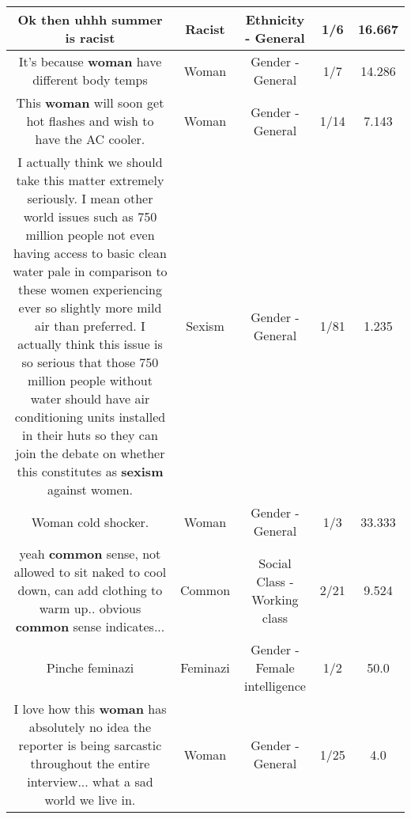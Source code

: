 \documentclass[11pt]{article}
\newlength\mylength
\begin{document}
\begin{center}
\begin{longtable}{|C{.65\mylength}|C{.30\mylength}|C{.12\mylength}|C{.12\mylength}|C{.12\mylength}|}
  \small Ok then uhhh summer is racist\normalsize   & Racist & Ethnicity - General & 1/6 & 16.667 \\  \hline
  \small It's because \textbf{woman} have different body temps\normalsize   & Woman & Gender - General & 1/7 & 14.286 \\  \hline
  \small This \textbf{woman} will soon get hot flashes and wish to have the AC cooler.\normalsize   & Woman & Gender - General & 1/14 & 7.143 \\  \hline
  \small I actually think we should take this matter extremely seriously. I mean other world issues such as 750 million people not even having access to basic clean water pale in comparison to these women experiencing ever so slightly more mild air than preferred. I actually think this issue is so serious that those 750 million people without water should have air conditioning units installed in their huts so they can join the debate on whether this constitutes as \textbf{sexism} against women.\normalsize   & Sexism & Gender - General & 1/81 & 1.235 \\  \hline
  \small Woman cold shocker.\normalsize   & Woman & Gender - General & 1/3 & 33.333 \\  \hline
  \small yeah \textbf{common} sense, not allowed to sit naked to cool down, can add clothing to warm up.. obvious \textbf{common} sense indicates...\normalsize   & Common & Social Class - Working class & 2/21 & 9.524 \\  \hline
  \small Pinche feminazi\normalsize   & Feminazi & Gender - Female intelligence & 1/2 & 50.0 \\  \hline
  \small I love how this \textbf{woman} has absolutely no idea the reporter is being sarcastic throughout the entire interview... what a sad world we live in.\normalsize   & Woman & Gender - General & 1/25 & 4.0 \\  \hline

\end{longtable}
\end{center}
\end{document}
